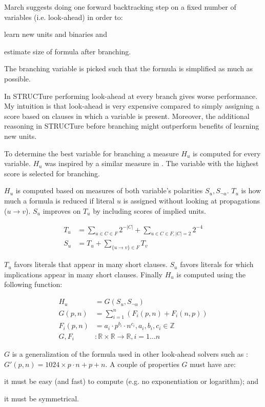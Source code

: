 March \cite{mine:march} suggests doing one forward backtracking
step on a fixed number of variables (i.e. look-ahead) in order to:
\begin{inparaenum}[a)]
  \item learn new units and binaries and
  \item estimate size of formula after branching.
\end{inparaenum} The branching variable is picked such that
the formula is simplified as much as possible.

In STRUCTure performing look-ahead at every branch gives worse
performance. My intuition is that look-ahead is very expensive
compared to simply assigning a score based on clauses in which a
variable is present. Moreover, the additional reasoning in STRUCTure
before branching might outperform benefits of learning new units.

To determine the best variable for branching a measure $H_u$
is computed for every variable.  $H_u$ was inspired by a similar
measure in \cite{mine:oksolver}. The variable with the highest
score is selected for branching.

$H_u$ is computed based on measures of both variable's polarities
$S_u, S_{\neg u}$. $T_u$ is how much a formula is reduced if literal
$u$ is assigned without looking at propagations ($u \rightarrow
v$). $S_u$ improves on $T_u$ by including scores of implied units.

\begin{align}
  T_u &= \sum_{u \in C \in F}{2^{-|C|}} + \sum_{u \in C \in F, |C| = 2}{2^{-4}} \\
  S_u &= T_u + \sum_{\{ u \rightarrow v \} \in F}{T_v}
\end{align}

$T_u$ favors literals that appear in many short clauses.
$S_u$ favors literals for which implications appear in many short clauses.
Finally $H_u$ is computed using the following function:

\begin{align}
  H_u &= G(S_u, S_{\neg u}) \\
  G(p, n) &= \sum_{i=1}^{n}{(F_i(p, n) + F_i(n, p))} \\
  F_i(p, n) &= a_i \cdot p^{b_i} \cdot n^{c_i}, a_i, b_i, c_i \in \mathbb{Z} \\
  G, F_i &: \mathbb{R} \times \mathbb{R} \rightarrow \mathbb{R}, i = 1 \ldots n
\end{align}

$G$ is a generalization of the formula used in other
look-ahead solvers such as \cite{mine:march}: $G'(p, n) =
1024 \times p \cdot n + p + n$. A couple of properties $G$ must have are:
\begin{inparaenum}[a)]
  \item it must be easy (and fast) to compute (e.g. no exponentiation or logarithm); and
  \item it must be symmetrical.
\end{inparaenum}



